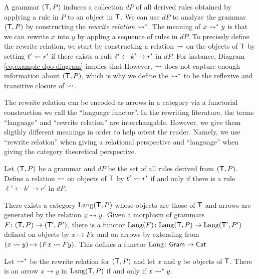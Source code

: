 \documentclass{amsart}
\begin{document}
A grammar $( \mathsf{T},P )$ induces a collection $dP$ of
all derived rules obtained by applying a rule in
$P$ to an object in $\mathsf{T}$.  We can use $dP$ to
analyze the grammar $(\mathsf{T},P)$ by constructing the
\emph{rewrite relation} $\rightsquigarrow^\ast$. The meaning
of $x \rightsquigarrow^\ast y$ is that we can rewrite $x$ into
$y$ by appling a sequence of rules in $dP$. To
precisely define the rewrite relation, we start by
constructing a relation $ \rightsquigarrow $ on the
objects of $ \mathsf{T} $ by setting
$ \ell' \rightsquigarrow r' $ if there exists a rule
$ \ell' \leftarrow k' \to r' $ in $ dP $. For instance,
Diagram \eqref{eq:example-dpo-diagram} implies
that  However,
$ \rightsquigarrow $ does not capture enough
information about $( \mathsf{T},P )$, which is why we
define the  $ \rightsquigarrow^\ast $ to
be the reflexive and transitive closure of
$ \rightsquigarrow $.

The rewrite relation can be encoded as arrows in a
category via a functorial construction we call the
``language functor''. In the rewriting literature,
the terms ``language'' and ``rewrite relation''
are interchangable. However, we give them sligthly
different meanings in order to help orient the
reader. Namely, we use ``rewrite relation'' when
giving a relational perspective and ``language''
when giving the category theoretical perspective.

\begin{theorem}
  \label{thm:Lang_from_Gram_to_Cat}
  Let $ (\mathsf{T},P) $ be a grammar and $ dP $ be the
  set of all rules derived from $ ( \mathsf{T},P )
  $. Define a relation $ \rightsquigarrow $ on objects
  of $ \mathsf{T} $ by $ \ell' \rightsquigarrow r' $ if and only
  if there is a rule $ \ell' \gets k' \to r' $ in
  $ dP $.

  There exists a category $ \mathrm{Lang} (\mathsf{T},P) $
  whose objects are those of $ \mathsf{T} $ and arrows are
  generated by the relation $ x \rightsquigarrow y
  $. Given a morphism of grammars
  $ F \colon (\mathsf{T},P) \to (\mathsf{T}',P') $, there is a
  functor
  $ \mathrm{Lang} (F) \colon \mathrm{Lang} (\mathsf{T},P) \to \mathrm{Lang}
  (\mathsf{T}',P') $ defined on objects by
  $ x \mapsto Fx $ and on arrows by extending from
  $ (x \rightsquigarrow y) \mapsto ( Fx \rightsquigarrow Fy )
  $. This defines a functor
  $ \mathrm{Lang} \colon \mathsf{Gram} \to \mathsf{Cat} $
\end{theorem}

\begin{corollary}
  Let $ \rightsquigarrow^\ast $ be the rewrite relation for
  $ ( \mathsf{T},P ) $ and let $ x $ and $ y $ be objects
  of $ \mathsf{T} $. There is an arrow $ x \to y $ in
  $ \mathrm{Lang} (\mathsf{T},P) $ if and only if
  $ x \rightsquigarrow^\ast y $.
\end{corollary}
\end{document}
